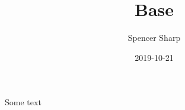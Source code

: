 \documentclass{article}
\title{Base}
\author{Spencer Sharp}
\date{2019-10-21}
\begin{document}
Some text
\end{document}
